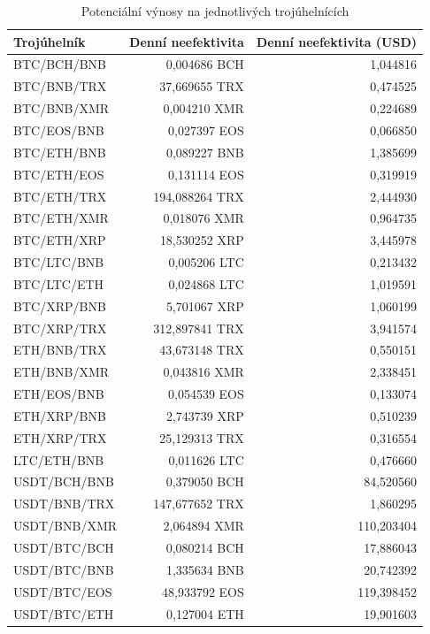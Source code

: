 \documentclass[thesis=B,czech]{FITthesis}[2019/03/21]
\begin{document}
\begin{table}\centering
\caption{Potenciální výnosy na jednotlivých trojúhelnících}
\label{table_gains}
\begin{tabular}{|| l | r | r ||}\hline Trojúhelník & Denní neefektivita & Denní neefektivita (USD)\\
 \hline
 \hline BTC/BCH/BNB & 0,004686 BCH & 1,044816\\ 
 \hline BTC/BNB/TRX & 37,669655 TRX & 0,474525\\ 
 \hline BTC/BNB/XMR & 0,004210 XMR & 0,224689\\ 
 \hline BTC/EOS/BNB & 0,027397 EOS & 0,066850\\ 
 \hline BTC/ETH/BNB & 0,089227 BNB & 1,385699\\ 
 \hline BTC/ETH/EOS & 0,131114 EOS & 0,319919\\ 
 \hline BTC/ETH/TRX & 194,088264 TRX & 2,444930\\ 
 \hline BTC/ETH/XMR & 0,018076 XMR & 0,964735\\ 
 \hline BTC/ETH/XRP & 18,530252 XRP & 3,445978\\ 
 \hline BTC/LTC/BNB & 0,005206 LTC & 0,213432\\ 
 \hline BTC/LTC/ETH & 0,024868 LTC & 1,019591\\ 
 \hline BTC/XRP/BNB & 5,701067 XRP & 1,060199\\ 
 \hline BTC/XRP/TRX & 312,897841 TRX & 3,941574\\ 
 \hline ETH/BNB/TRX & 43,673148 TRX & 0,550151\\ 
 \hline ETH/BNB/XMR & 0,043816 XMR & 2,338451\\ 
 \hline ETH/EOS/BNB & 0,054539 EOS & 0,133074\\ 
 \hline ETH/XRP/BNB & 2,743739 XRP & 0,510239\\ 
 \hline ETH/XRP/TRX & 25,129313 TRX & 0,316554\\ 
 \hline LTC/ETH/BNB & 0,011626 LTC & 0,476660\\ 
 \hline USDT/BCH/BNB & 0,379050 BCH & 84,520560\\ 
 \hline USDT/BNB/TRX & 147,677652 TRX & 1,860295\\ 
 \hline USDT/BNB/XMR & 2,064894 XMR & 110,203404\\ 
 \hline USDT/BTC/BCH & 0,080214 BCH & 17,886043\\ 
 \hline USDT/BTC/BNB & 1,335634 BNB & 20,742392\\ 
 \hline USDT/BTC/EOS & 48,933792 EOS & 119,398452\\ 
 \hline USDT/BTC/ETH & 0,127004 ETH & 19,901603\\ 

\end{tabular}
\end{table}
\end{document}
